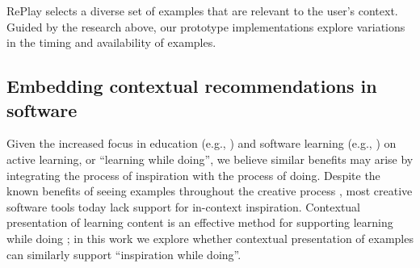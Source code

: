 RePlay selects a diverse set of examples that are relevant to the user's context. Guided by the research above, our prototype implementations explore variations in the timing and availability of examples.


\subsection{Embedding contextual recommendations in software}
Given the increased focus in education (e.g., \cite{Prince2004}) and software learning (e.g., \cite{Greene2002, Grossman2010a}) on active learning, or ``learning while doing'', we believe similar benefits may arise by integrating the process of inspiration with the process of doing. Despite the known benefits of seeing examples throughout the creative process \cite{Kulkarni}, most creative software tools today lack support for in-context inspiration. Contextual presentation of learning content is an effective method for supporting learning while doing \cite{Grossman2010a, Matejka2011, Ichinco2017, Matejka2009}; in this work we explore whether contextual presentation of examples can similarly support ``inspiration while doing''. 

